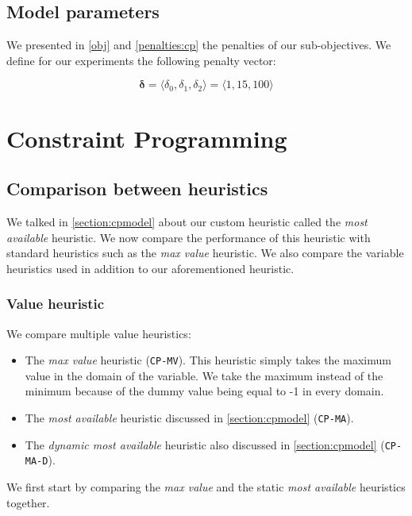 \documentclass[../../thesis.tex]{subfiles}
\begin{document}
\subsection{Model parameters}

We presented in \autoref{obj} and \autoref{penalties:cp} the penalties of our sub-objectives.
We define for our experiments the following penalty vector:

\begin{equation*}
  \bm{\delta} = \langle\delta_0, \delta_1, \delta_2\rangle = \langle1, 15, 100\rangle
\end{equation*}

\section{Constraint Programming}

\subsection{Comparison between heuristics}
\label{section:experiments:heuristics}

We talked in \autoref{section:cpmodel} about our custom heuristic called the \emph{most available} heuristic.
We now compare the performance of this heuristic with standard heuristics such as the \emph{max value} heuristic.
We also compare the variable heuristics used in addition to our aforementioned heuristic.

\subsubsection{Value heuristic}

We compare multiple value heuristics:

\begin{itemize}
  \item The \emph{max value} heuristic (\texttt{CP-MV}). This heuristic simply takes the maximum value in the domain of the variable. We 
  take the maximum instead of the minimum because of the dummy value being equal to -1 in every domain. 
  \item The \emph{most available} heuristic discussed in \autoref{section:cpmodel} (\texttt{CP-MA}).
  \item The \emph{dynamic most available} heuristic also discussed in \autoref{section:cpmodel} (\texttt{CP-MA-D}).
\end{itemize}

We first start by comparing the \emph{max value} and the static \emph{most available} heuristics together.
\end{document}
